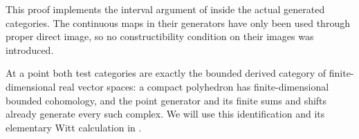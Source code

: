 This proof implements the interval argument of
\cite[Proposition~3.11]{Woolf2008} inside the actual generated
categories.  The continuous maps in their generators have only been
used through proper direct image, so no constructibility condition on
their images was introduced.

At a point both test categories are exactly the bounded derived category
of finite-dimensional real vector spaces: a compact polyhedron has
finite-dimensional bounded cohomology, and the point generator and its
finite sums and shifts already generate every such complex.  We will
use this identification and its elementary Witt calculation in
.
